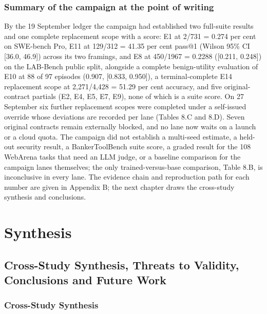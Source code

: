 \documentclass[12pt,a4paper]{report}
\begin{document}
\section{Summary of the campaign at the point of
writing}\label{summary-of-the-campaign-at-the-point-of-writing}

By the 19 September ledger the campaign had established two full-suite
results and one complete replacement scope with a score: E1 at 2/731 =
0.274 per cent on SWE-bench Pro, E11 at 129/312 = 41.35 per cent pass@1
(Wilson 95\% CI {[}36.0, 46.9{]}) across its two framings, and E8 at
450/1967 = 0.2288 ({[}0.211, 0.248{]}) on the LAB-Bench public split,
alongside a complete benign-utility evaluation of E10 at 88 of 97
episodes (0.907, {[}0.833, 0.950{]}), a terminal-complete E14
replacement scope at 2,271/4,428 = 51.29 per cent accuracy, and five
original-contract partials (E2, E4, E5, E7, E9), none of which is a
suite score. On 27 September six further replacement scopes were
completed under a self-issued override whose deviations are recorded per
lane (Tables 8.C and 8.D). Seven original contracts remain externally
blocked, and no lane now waits on a launch or a cloud quota. The
campaign did not establish a multi-seed estimate, a held-out security
result, a BankerToolBench suite score, a graded result for the 108
WebArena tasks that need an LLM judge, or a baseline comparison for the
campaign lanes themselves; the only trained-versus-base comparison,
Table 8.B, is inconclusive in every lane. The evidence chain and
reproduction path for each number are given in Appendix B; the next
chapter draws the cross-study synthesis and conclusions.



\part{Synthesis}


\chapter{Cross-Study Synthesis, Threats to Validity, Conclusions and
Future
Work}\label{cross-study-synthesis-threats-to-validity-conclusions-and-future-work}

\section{Cross-Study Synthesis}\label{cross-study-synthesis}
\end{document}
